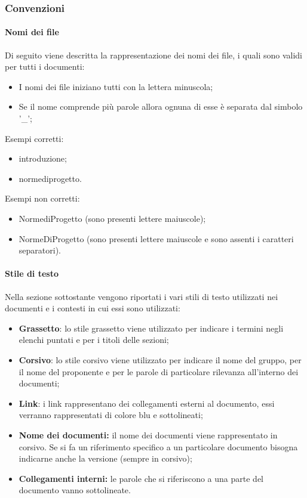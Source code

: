 \subsubsection{Convenzioni}
\paragraph{Nomi dei file}
Di seguito viene descritta la rappresentazione dei nomi dei file, i quali sono validi per tutti i documenti:
\begin{itemize}
\item I nomi dei file iniziano tutti con la lettera minuscola;
\item Se il nome comprende più parole allora ognuna di esse è separata dal simbolo '\_';
\end {itemize}
Esempi corretti:
\begin{itemize}
\item introduzione;
\item norme\textunderscore di\textunderscore progetto.
\end {itemize}
Esempi non corretti:
\begin{itemize}
\item Norme\textunderscore di\textunderscore Progetto (sono presenti lettere maiuscole);
\item NormeDiProgetto (sono presenti lettere maiuscole e sono assenti i caratteri separatori).
\end {itemize}

\paragraph{Stile di testo}
Nella sezione sottostante vengono riportati i vari stili di testo utilizzati nei documenti e i contesti in cui essi sono utilizzati:
\begin {itemize}
\item \textbf{Grassetto}: lo stile grassetto viene utilizzato per indicare i termini negli elenchi puntati e per i titoli delle sezioni;
\item \textbf{Corsivo}: lo stile corsivo viene utilizzato per indicare il nome del gruppo, per il nome del proponente e per le parole di particolare rilevanza all'interno dei documenti;
\item \textbf{Link}: i link rappresentano dei collegamenti esterni al documento, essi verranno rappresentati di colore blu e sottolineati;
\item \textbf{Nome dei documenti:} il nome dei documenti viene rappresentato in corsivo. Se si fa un riferimento specifico a un particolare documento bisogna indicarne anche la versione (sempre in corsivo);
\item \textbf{Collegamenti interni:} le parole che si riferiscono a una parte del documento vanno sottolineate.
\end {itemize}
